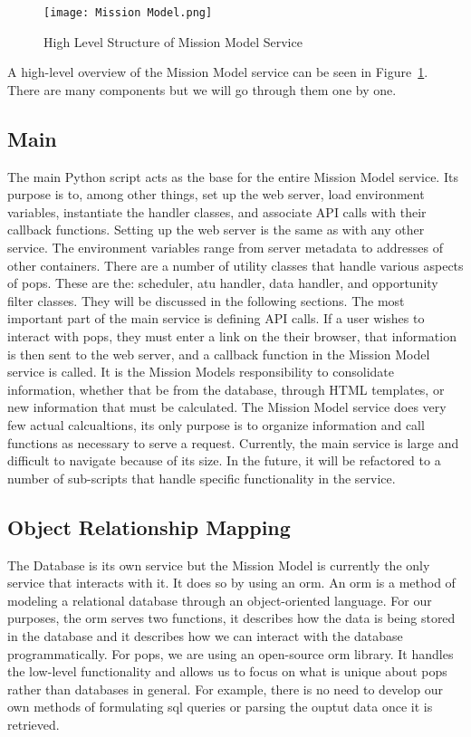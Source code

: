 \begin{figure}[h]
    \centering
    \texttt{[image: Mission Model.png]} 
    \caption{High Level Structure of Mission Model Service}
    \label{fig:mission_model} 
\end{figure}

A high-level overview of the Mission Model service can be seen in
Figure~\ref{fig:mission_model}. There are many components but we will go
through them one by one.

\subsection{Main} 

The main Python script acts as the base for the entire Mission Model service.
Its purpose is to, among other things, set up the web server, load environment
variables, instantiate the handler classes, and associate API calls with their
callback functions. Setting up the web server is the same as with any other
service. The environment variables range from server metadata to addresses of
other containers. There are a number of utility classes that handle various
aspects of \gls{pops}. These are the: scheduler, \gls{atu} handler, data
handler, and opportunity filter classes. They will be discussed in the
following sections. The most important part of the main service is defining API
calls. If a user wishes to interact with \gls{pops}, they must enter a link on
the their browser, that information is then sent to the web server, and a
callback function in the Mission Model service is called. It is the Mission
Models responsibility to consolidate information, whether that be from the
database, through HTML templates, or new information that must be calculated.
The Mission Model service does very few actual calcualtions, its only purpose
is to organize information and call functions as necessary to serve a request.
Currently, the main service is large and difficult to navigate because of its
size. In the future, it will be refactored to a number of sub-scripts that
handle specific functionality in the service.

\subsection{Object Relationship Mapping}

The Database is its own service but the Mission Model is currently the only
service that interacts with it. It does so by using an \gls{orm}. An \gls{orm}
is a method of modeling a relational database through an object-oriented
language. For our purposes, the \gls{orm} serves two functions, it describes
how the data is being stored in the database and it describes how we can
interact with the database programmatically. For \gls{pops}, we are using an
open-source \gls{orm} library. It handles the low-level functionality and
allows us to focus on what is unique about \gls{pops} rather than databases in
general. For example, there is no need to develop our own methods of
formulating \gls{sql} queries or parsing the ouptut data once it is retrieved. 

